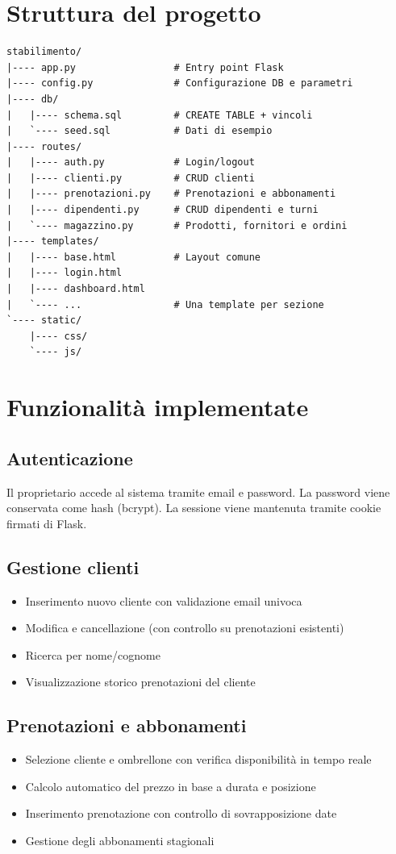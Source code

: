 \section{Struttura del progetto}

\begin{verbatim}
stabilimento/
|---- app.py                 # Entry point Flask
|---- config.py              # Configurazione DB e parametri
|---- db/
|   |---- schema.sql         # CREATE TABLE + vincoli
|   `---- seed.sql           # Dati di esempio
|---- routes/
|   |---- auth.py            # Login/logout
|   |---- clienti.py         # CRUD clienti
|   |---- prenotazioni.py    # Prenotazioni e abbonamenti
|   |---- dipendenti.py      # CRUD dipendenti e turni
|   `---- magazzino.py       # Prodotti, fornitori e ordini
|---- templates/
|   |---- base.html          # Layout comune
|   |---- login.html
|   |---- dashboard.html
|   `---- ...                # Una template per sezione
`---- static/
    |---- css/
    `---- js/
\end{verbatim}

\section{Funzionalit\`{a} implementate}

\subsection{Autenticazione}
Il proprietario accede al sistema tramite email e password. La password
viene conservata come hash (bcrypt). La sessione viene mantenuta tramite
cookie firmati di Flask.

\subsection{Gestione clienti}
\begin{itemize}
  \item Inserimento nuovo cliente con validazione email univoca
  \item Modifica e cancellazione (con controllo su prenotazioni esistenti)
  \item Ricerca per nome/cognome
  \item Visualizzazione storico prenotazioni del cliente
\end{itemize}

\subsection{Prenotazioni e abbonamenti}
\begin{itemize}
  \item Selezione cliente e ombrellone con verifica disponibilit\`{a} in tempo reale
  \item Calcolo automatico del prezzo in base a durata e posizione
  \item Inserimento prenotazione con controllo di sovrapposizione date
  \item Gestione degli abbonamenti stagionali
\end{itemize}

